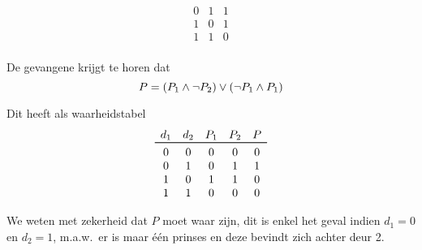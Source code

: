 \begin{oef}
\begin{opl}
\begin{samepage}
\[\begin{array}{ccc}
    0 & 1 & 1 \\
    1 & 0 & 1 \\
    1 & 1 & 0 \\
  \end{array}
\]
\end{samepage}
\begin{samepage}
De gevangene krijgt te horen dat
\[
  P = (P_1 \wedge \neg P_2) \vee (\neg P_1 \wedge P_1)
\]
\end{samepage}
\begin{samepage}
Dit heeft als waarheidstabel
\[
  \begin{array}{ccccc}
    d_1 & d_2 & P_1 & P_2 & P \\
    \toprule
    0 & 0 & 0 & 0 & 0 \\
    0 & 1 & 0 & 1 & 1 \\
    1 & 0 & 1 & 1 & 0 \\
    1 & 1 & 0 & 0 & 0 \\
  \end{array}
\]
\end{samepage}
We weten met zekerheid dat $P$ moet waar zijn, dit is enkel het geval indien $d_1 = 0$ en $d_2 = 1$, m.a.w.\ er
is maar \'e\'en prinses en deze bevindt zich achter deur 2.
\end{opl}
\end{oef}

